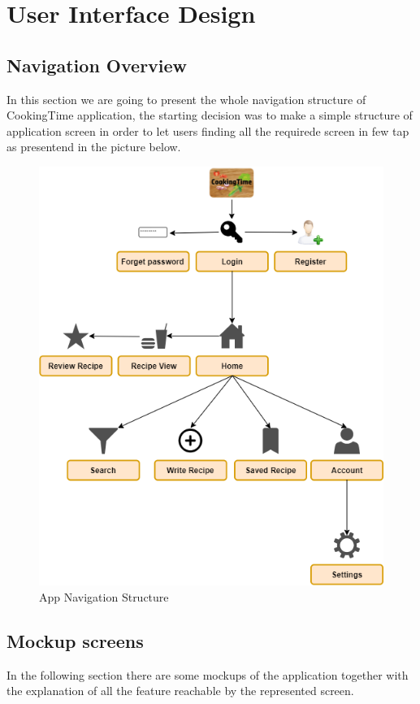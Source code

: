 \chapter{User Interface Design}

\section{Navigation Overview}
In this section we are going to present the whole navigation structure of CookingTime application, the starting decision was to make a simple structure of application screen in order to let users finding all the requirede screen in few tap as presentend in the picture below.
\begin{figure}[H]
	\centering
	\includegraphics[width = .5\linewidth]{img/CookingTimeNavigator.png}
	\caption{App Navigation Structure}
\end{figure}

\section{Mockup screens}
In the following section there are some mockups of the application together with the explanation of all the feature reachable by the represented screen.


